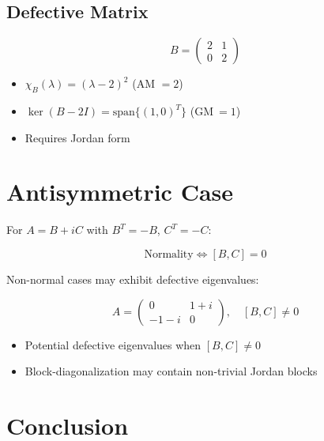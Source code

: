 \documentclass[aps,preprint]{revtex4}
\begin{document}
\subsection{Defective Matrix}

\begin{equation}
B = 
\begin{pmatrix}
2 & 1 \\ 
0 & 2%
\end{pmatrix}%
\end{equation}

\begin{itemize}
\item $\chi _{B}(\lambda )=(\lambda -2)^{2}$ (AM $=2$)

\item $\ker (B-2I)=\text{span}\{(1,0)^{T}\}$ (GM$\ =1$)

\item Requires Jordan form
\end{itemize}

\section{Antisymmetric Case}

For $A = B + iC$ with $B^T = -B$, $C^T = -C$:

\begin{equation}
\text{Normality} \Leftrightarrow [B,C] = 0
\end{equation}

Non-normal cases may exhibit defective eigenvalues:

\begin{equation}
A = 
\begin{pmatrix}
0 & 1+i \\ 
-1-i & 0%
\end{pmatrix}%
, \quad [B,C] \neq 0
\end{equation}

\begin{itemize}
\item Potential defective eigenvalues when $[B,C] \neq 0$

\item Block-diagonalization may contain non-trivial Jordan blocks
\end{itemize}

\section*{Conclusion}
\end{document}
